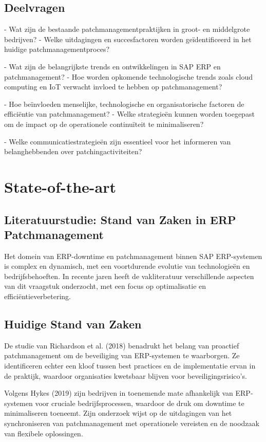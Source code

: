 \subsection{Deelvragen}
- Wat zijn de bestaande patchmanagementpraktijken in groot- en middelgrote bedrijven?
- Welke uitdagingen en succesfactoren worden geïdentificeerd in het huidige patchmanagementproces?

- Wat zijn de belangrijkste trends en ontwikkelingen in SAP ERP en patchmanagement?
- Hoe worden opkomende technologische trends zoals cloud computing en IoT verwacht invloed te hebben op patchmanagement?

- Hoe beïnvloeden menselijke, technologische en organisatorische factoren de efficiëntie van patchmanagement?
- Welke strategieën kunnen worden toegepast om de impact op de operationele continuïteit te minimaliseren?

- Welke communicatiestrategieën zijn essentieel voor het informeren van belanghebbenden over patchingactiviteiten?



\section{State-of-the-art}%
\label{sec:state-of-the-art}

\subsection{Literatuurstudie: Stand van Zaken in ERP Patchmanagement}

Het domein van ERP-downtime en patchmanagement binnen SAP ERP-systemen is complex en dynamisch, met een voortdurende evolutie van technologieën en bedrijfsbehoeften. In recente jaren heeft de vakliteratuur verschillende aspecten van dit vraagstuk onderzocht, met een focus op optimalisatie en efficiëntieverbetering.

\subsection{Huidige Stand van Zaken}

De studie van Richardson et al. (2018) benadrukt het belang van proactief patchmanagement om de beveiliging van ERP-systemen te waarborgen. Ze identificeren echter een kloof tussen best practices en de implementatie ervan in de praktijk, waardoor organisaties kwetsbaar blijven voor beveiligingsrisico's.

Volgens Hykes (2019) zijn bedrijven in toenemende mate afhankelijk van ERP-systemen voor cruciale bedrijfsprocessen, waardoor de druk om downtime te minimaliseren toeneemt. Zijn onderzoek wijst op de uitdagingen van het synchroniseren van patchmanagement met operationele vereisten en de noodzaak van flexibele oplossingen.

